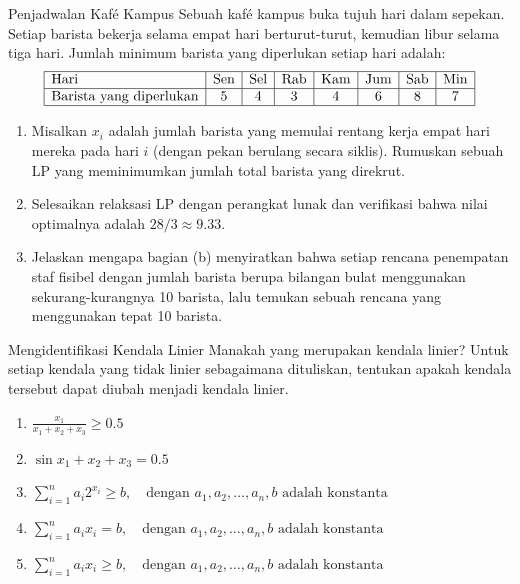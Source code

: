 \begin{ex}{Penjadwalan Kaf\'e Kampus}{}
\label{ex:cafe-scheduling}
 Sebuah kaf\'e kampus buka tujuh hari dalam sepekan. Setiap barista bekerja selama empat hari berturut-turut, kemudian libur selama tiga hari. Jumlah minimum barista yang diperlukan setiap hari adalah:
\[
\begin{array}{|l|c|c|c|c|c|c|c|}
\hline
\text{Hari} & \text{Sen} & \text{Sel} & \text{Rab} & \text{Kam} & \text{Jum} & \text{Sab} & \text{Min} \\
\hline
\text{Barista yang diperlukan} & 5 & 4 & 3 & 4 & 6 & 8 & 7 \\
\hline
\end{array}
\]
\par{}\label{tab:modeling-linear-programming-tab09}%

\begin{enumerate}
\item Misalkan $x_i$ adalah jumlah barista yang memulai rentang kerja empat hari mereka pada hari $i$ (dengan pekan berulang secara siklis). Rumuskan sebuah LP yang meminimumkan jumlah total barista yang direkrut.
\item Selesaikan relaksasi LP dengan perangkat lunak dan verifikasi bahwa nilai optimalnya adalah $28/3 \approx 9.33$.
\item Jelaskan mengapa bagian (b) menyiratkan bahwa setiap rencana penempatan staf fisibel dengan jumlah barista berupa bilangan bulat menggunakan sekurang-kurangnya 10 barista, lalu temukan sebuah rencana yang menggunakan tepat 10 barista.
\end{enumerate}
\end{ex}


\begin{ex}{Mengidentifikasi Kendala Linier}{}
\label{ex:linear-inequalities-check}
 Manakah yang merupakan kendala linier? Untuk setiap kendala yang tidak linier sebagaimana dituliskan, tentukan apakah kendala tersebut dapat diubah menjadi kendala linier.

\begin{enumerate}
    \item $\frac{x_1}{x_1 + x_2 + x_3} \geq 0.5$
    \item $\sin x_1 + x_2 + x_3 = 0.5$
    \item $\sum_{i=1}^n a_i 2^{x_i} \geq b, \quad \text{dengan } a_1, a_2, \dots, a_n, b \text{ adalah konstanta}$
    \item $\sum_{i=1}^n a_i x_i = b, \quad \text{dengan } a_1, a_2, \dots, a_n, b \text{ adalah konstanta}$
    \item $\sum_{i=1}^n a_i x_i \geq b, \quad \text{dengan } a_1, a_2, \dots, a_n, b \text{ adalah konstanta}$
\end{enumerate}
\end{ex}

